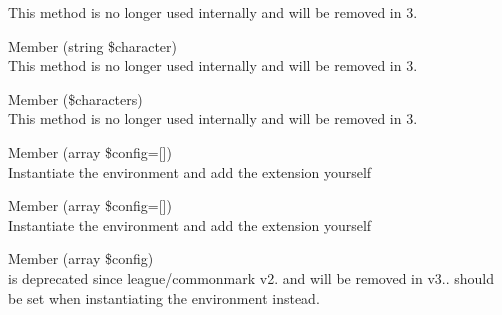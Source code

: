 \begin{DoxyRefList}
This method is no longer used internally and will be removed in 3.  
\item[Member \doxylink{class_league_1_1_common_mark_1_1_delimiter_1_1_delimiter_stack_af141cced796067cfce6d9c43ad695dee}{League\textbackslash{}Common\+Mark\textbackslash{}Delimiter\textbackslash{}Delimiter\+Stack\+::remove\+Earlier\+Matches} (string \$character)]\hfill \\
\label{deprecated__deprecated000071}%
%
This method is no longer used internally and will be removed in 3.  
\item[Member \doxylink{class_league_1_1_common_mark_1_1_delimiter_1_1_delimiter_stack_a55f483cef7983d0c43f6cf5495f1d12d}{League\textbackslash{}Common\+Mark\textbackslash{}Delimiter\textbackslash{}Delimiter\+Stack\+::search\+By\+Character} (\$characters)]\hfill \\
\label{deprecated__deprecated000072}%
%
This method is no longer used internally and will be removed in 3. 
\item[Member \doxylink{class_league_1_1_common_mark_1_1_environment_1_1_environment_a813f8b51844c7e4685045724422d979a}{League\textbackslash{}Common\+Mark\textbackslash{}Environment\textbackslash{}Environment\+::create\+Common\+Mark\+Environment} (array \$config=\mbox{[}\mbox{]})]\hfill \\
\label{deprecated__deprecated000075}%
%
Instantiate the environment and add the extension yourself 
\item[Member \doxylink{class_league_1_1_common_mark_1_1_environment_1_1_environment_a3d236d50e5fb5bd46455779cc55835b6}{League\textbackslash{}Common\+Mark\textbackslash{}Environment\textbackslash{}Environment\+::create\+GFMEnvironment} (array \$config=\mbox{[}\mbox{]})]\hfill \\
\label{deprecated__deprecated000076}%
%
Instantiate the environment and add the extension yourself 
\item[Member \doxylink{class_league_1_1_common_mark_1_1_environment_1_1_environment_ad7e7c0aa60b00fc06bc63ca86e0d44d9}{League\textbackslash{}Common\+Mark\textbackslash{}Environment\textbackslash{}Environment\+::merge\+Config} (array \$config)]\hfill \\
\label{deprecated__deprecated000074}%
%
 is deprecated since league/commonmark v2. and will be removed in v3..  should be set when instantiating the environment instead. 

\end{DoxyRefList}
